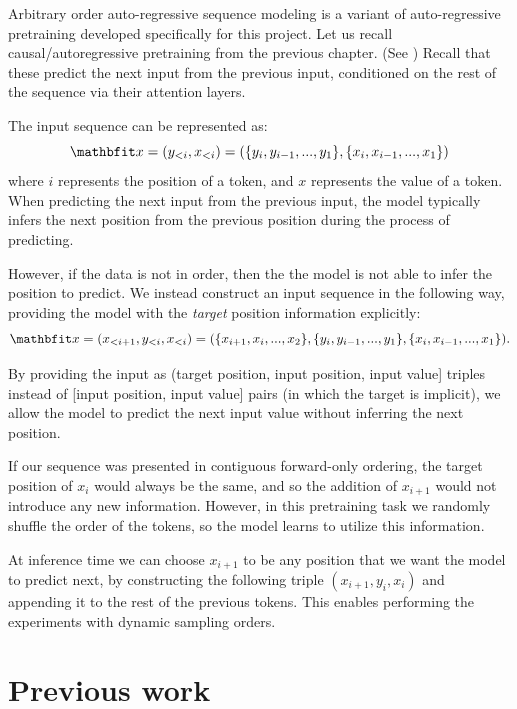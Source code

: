 Arbitrary order auto-regressive sequence modeling is a variant of auto-regressive pretraining developed specifically for this project. Let us recall causal/autoregressive pretraining from the previous chapter. (See ) Recall that these predict the next input from the previous input, conditioned on the rest of the sequence via their attention layers.

The input sequence can be represented as:
\begin{equation*}
   \x = (y_{<i}, x_{<i}) = ( \{ y_i, y_{i-1}, ..., y_1 \}, \{ x_i, x_{i-1}, ..., x_1 \} )
\end{equation*}
where $i$ represents the position of a token, and $x$ represents the value of a token. When predicting the next input from the previous input, the model typically infers the next position from the previous position during the process of predicting.

However, if the data is not in order, then the the model is not able to infer the position to predict. We instead construct an input sequence in the following way, providing the model with the \textit{target} position information explicitly:
\begin{equation*}
   \x = (x_{<i+1}, y_{<i}, x_{<i}) = ( \{ x_{i+1}, x_{i}, ..., x_2 \}, \{ y_i, y_{i-1}, ..., y_1 \}, \{ x_i, x_{i-1}, ..., x_1 \} ).
\end{equation*}

By providing the input as (target position, input position, input value] triples instead of [input position, input value] pairs (in which the target is implicit), we allow the model to predict the next input value without inferring the next position.

If our sequence was presented in contiguous forward-only ordering, the target position of $x_i$ would always be the same, and so the addition of $x_{i+1}$ would not introduce any new information. However, in this pretraining task we randomly shuffle the order of the tokens, so the model learns to utilize this information.

At inference time we can choose $x_{i+1}$ to be any position that we want the model to predict next, by constructing the following triple $(x_{i+1}, y_i, x_i)$ and appending it to the rest of the previous tokens. This enables performing the experiments with dynamic sampling orders.

\section{Previous work}
\label{s:previous-work}


